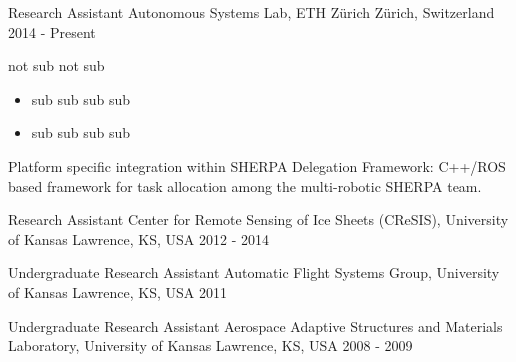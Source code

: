 

\begin{cventries}

  \cventry
    {Research Assistant} %
    {Autonomous Systems Lab, ETH Z\"{u}rich} %
    {Z\"{u}rich, Switzerland} %
    {2014 - Present} %
    {
      \begin{cvitems} %
        \item {not sub not sub}
		\begin{itemize}
		\item{sub sub sub sub}
		\item{sub sub sub sub}		
		\end{itemize}		       
        \item {Platform specific integration within SHERPA Delegation Framework: C++/ROS based framework for task allocation among the multi-robotic SHERPA team.}
      \end{cvitems}
    }

  \cventry
    {Research Assistant} %
    {Center for Remote Sensing of Ice Sheets (CReSIS), University of Kansas} %
    {Lawrence, KS, USA} %
    {2012 - 2014} %
    {
      \begin{cvitems} %
        \item {}
      \end{cvitems}
    }

  \cventry
    {Undergraduate Research Assistant} %
    {Automatic Flight Systems Group, University of Kansas} %
    {Lawrence, KS, USA} %
    {2011} %
    {
      \begin{cvitems} %
        \item {}
      \end{cvitems} 
    }

  \cventry
    {Undergraduate Research Assistant} %
    {Aerospace Adaptive Structures and Materials Laboratory, University of Kansas} %
    {Lawrence, KS, USA} %
    {2008 - 2009} %
    {
      \begin{cvitems} %
        \item {}
      \end{cvitems}
    }


\end{cventries}
